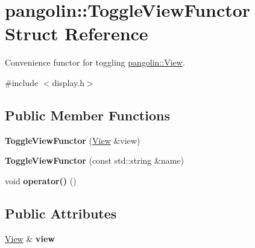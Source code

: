 \hypertarget{structpangolin_1_1_toggle_view_functor}{}\section{pangolin\+:\+:Toggle\+View\+Functor Struct Reference}
\label{structpangolin_1_1_toggle_view_functor}


Convenience functor for toggling \hyperlink{structpangolin_1_1_view}{pangolin\+::\+View}.  




{\ttfamily \#include $<$display.\+h$>$}

\subsection*{Public Member Functions}
\begin{DoxyCompactItemize}
\item 
{\bfseries Toggle\+View\+Functor} (\hyperlink{structpangolin_1_1_view}{View} \&view)\hypertarget{structpangolin_1_1_toggle_view_functor_a61d137ec3da01e7276cd016d6bdf8c89}{}\label{structpangolin_1_1_toggle_view_functor_a61d137ec3da01e7276cd016d6bdf8c89}

\item 
{\bfseries Toggle\+View\+Functor} (const std\+::string \&name)\hypertarget{structpangolin_1_1_toggle_view_functor_a4cb0e9c355570b331acd7b050e0f1588}{}\label{structpangolin_1_1_toggle_view_functor_a4cb0e9c355570b331acd7b050e0f1588}

\item 
void {\bfseries operator()} ()\hypertarget{structpangolin_1_1_toggle_view_functor_a991cfb0162fb4b7bee1c60257ca9e051}{}\label{structpangolin_1_1_toggle_view_functor_a991cfb0162fb4b7bee1c60257ca9e051}

\end{DoxyCompactItemize}
\subsection*{Public Attributes}
\begin{DoxyCompactItemize}
\item 
\hyperlink{structpangolin_1_1_view}{View} \& {\bfseries view}\hypertarget{structpangolin_1_1_toggle_view_functor_a0b2f5e0420cebb0820d0c07d979d9b99}{}\label{structpangolin_1_1_toggle_view_functor_a0b2f5e0420cebb0820d0c07d979d9b99}

\end{DoxyCompactItemize}


